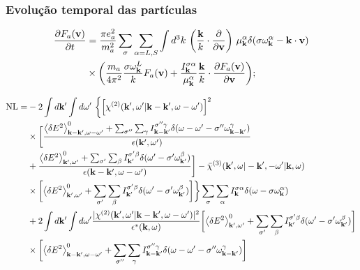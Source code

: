 \documentclass[10pt,aspectratio=1610,lualatex]{beamer}
\begin{document}
\begin{frame}
  \frametitle{Evolução temporal das partículas}
  \begin{equation*}
  \begin{split}
    \frac{\partial F_a({\bf v})}{\partial t}&=\frac{\pi e_a^2}{m_a^2}
    \sum_\sigma\sum_{\alpha=L,S}\int d^3k\ \biggl(\frac{\bf k}{k}
    \cdot\frac{\partial}{\partial{\bf v}}\biggr)\ \mu_{\bf k}^\alpha
    \delta(\sigma\omega_{\bf k}^\alpha-{\bf k}\cdot{\bf v})\\
    &\times\biggl(\frac{m_a}{4\pi^2}\frac{\sigma\omega_{\bf k}^L}{k}
    F_a({\bf v})+\frac{I_{\bf k}^{\sigma\alpha}}{\mu_{\bf k}^\alpha}
    \frac{\bf k}{k}\cdot\frac{\partial F_a({\bf v})}{\partial{\bf v}}\biggr);
  \end{split}
  \end{equation*}
\end{frame}


\begin{frame}\vspace{-0.6cm}
  \begin{displaymath}
    \begin{split}
        \mbox{NL}
 =&-2\int d{\bf k'} \int d\omega '\
     \biggl\{ \left[\chi^{(2)}({\bf k'},\omega '|{\bf k - k'},
     \omega-\omega ')\right]^2\\
  &\times\biggl[\frac{\left< \delta E^2 \right>_{{\bf k-k'},\omega-\omega '}^0
     +\sum_{\sigma ''}\sum_{\gamma} I_{\bf k -k'}^{\sigma '' \gamma}
     \delta(\omega-\omega ' -\sigma '' \omega_{\bf k -k'}^\gamma)}
     {\epsilon({\bf k'},\omega ')}\\
  &+\frac{\left< \delta E^2 \right>_{{\bf k'},\omega '}^0
  +\sum_{\sigma '}\sum_{\beta}
  I_{\bf k'}^{\sigma ' \beta}\delta(\omega '-\sigma ' \omega_{\bf k'}^\beta)}
     {\epsilon({\bf k-k'},\omega-\omega ')}\biggr]
     -\bar \chi^{(3)}({\bf k'},\omega|-{\bf k'},-\omega '|{\bf k},\omega)\\
     &\times\biggl[ \left< \delta E^2 \right>_{{\bf k'},\omega '}^0
	+\sum_{\sigma '}\sum_{\beta}I_{\bf k'}^{\sigma ' \beta}
	\delta(\omega '-\sigma ' \omega_{\bf k'}^\beta) \biggr]\biggr\}
	\sum_{\sigma}\sum_{\alpha}
  I_{\bf k}^{\sigma \alpha}\delta(\omega-\sigma \omega_{\bf k}^\alpha)\\
  &+2\int d{\bf k'} \int d\omega '
  \frac{|\chi^{(2)}({\bf k'},\omega '|{\bf k-k'},\omega-\omega ')|^2}
     {\epsilon^*({\bf k},\omega)}\biggl[ \left< \delta E^2 \right>_{{\bf k'},\omega '}^0
  +\sum_{\sigma '}\sum_{\beta}
     I_{\bf k'}^{\sigma ' \beta}\delta(\omega '-\sigma ' \omega_{\bf k'}^\beta) \biggr]\\
  &\times \biggl[ \left< \delta E^2 \right>_{{\bf k - k'},\omega-\omega '}^0
     +\sum_{\sigma ''}\sum_{\gamma} I_{\bf k -k'}^{\sigma '' \gamma}
     \delta(\omega-\omega ' -\sigma '' \omega_{\bf k -k'}^\gamma) \biggr]
    \end{split}
  \end{displaymath}
 \end{frame}
\end{document}
